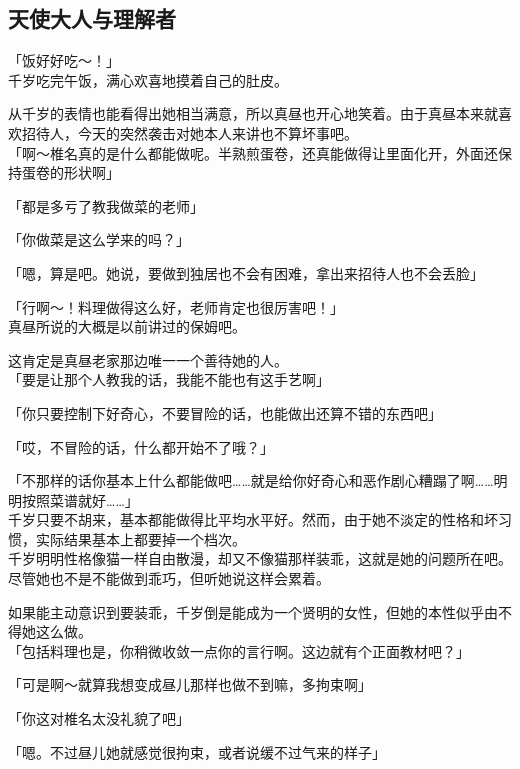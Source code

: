 \subsection{天使大人与理解者}

「饭好好吃～！」\\

千岁吃完午饭，满心欢喜地摸着自己的肚皮。

从千岁的表情也能看得出她相当满意，所以真昼也开心地笑着。由于真昼本来就喜欢招待人，今天的突然袭击对她本人来讲也不算坏事吧。\\

「啊～椎名真的是什么都能做呢。半熟煎蛋卷，还真能做得让里面化开，外面还保持蛋卷的形状啊」

「都是多亏了教我做菜的老师」

「你做菜是这么学来的吗？」

「嗯，算是吧。她说，要做到独居也不会有困难，拿出来招待人也不会丢脸」

「行啊～！料理做得这么好，老师肯定也很厉害吧！」\\

真昼所说的大概是以前讲过的保姆吧。

这肯定是真昼老家那边唯一一个善待她的人。\\

「要是让那个人教我的话，我能不能也有这手艺啊」

「你只要控制下好奇心，不要冒险的话，也能做出还算不错的东西吧」

「哎，不冒险的话，什么都开始不了哦？」

「不那样的话你基本上什么都能做吧……就是给你好奇心和恶作剧心糟蹋了啊……明明按照菜谱就好……」\\

千岁只要不胡来，基本都能做得比平均水平好。然而，由于她不淡定的性格和坏习惯，实际结果基本上都要掉一个档次。\\

千岁明明性格像猫一样自由散漫，却又不像猫那样装乖，这就是她的问题所在吧。尽管她也不是不能做到乖巧，但听她说这样会累着。

如果能主动意识到要装乖，千岁倒是能成为一个贤明的女性，但她的本性似乎由不得她这么做。\\

「包括料理也是，你稍微收敛一点你的言行啊。这边就有个正面教材吧？」

「可是啊～就算我想变成昼儿那样也做不到嘛，多拘束啊」

「你这对椎名太没礼貌了吧」

「嗯。不过昼儿她就感觉很拘束，或者说缓不过气来的样子」\\

